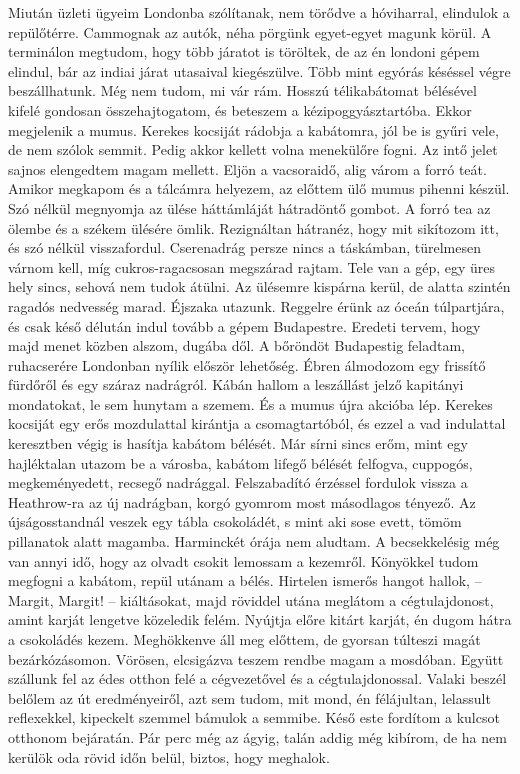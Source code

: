 Miután üzleti ügyeim Londonba szólítanak, nem törődve a hóviharral,
elindulok a repülőtérre. Cammognak az autók, néha pörgünk
egyet-egyet magunk körül. A terminálon megtudom, hogy több járatot
is töröltek, de az én londoni gépem elindul, bár az indiai járat utasaival
kiegészülve. Több mint egyórás késéssel végre beszállhatunk. Még
nem tudom, mi vár rám. Hosszú télikabátomat bélésével kifelé gondosan
összehajtogatom, és beteszem a kézipoggyásztartóba. Ekkor megjelenik
a mumus. Kerekes kocsiját rádobja a kabátomra, jól be is gyűri
vele, de nem szólok semmit. Pedig akkor kellett volna menekülőre fogni.
Az intő jelet sajnos elengedtem magam mellett. Eljön a vacsoraidő,
alig várom a forró teát. Amikor megkapom és a tálcámra helyezem, az
előttem ülő mumus pihenni készül. Szó nélkül megnyomja az ülése
háttámláját hátradöntő gombot. A forró tea az ölembe és a székem
ülésére ömlik. Rezignáltan hátranéz, hogy mit sikítozom itt, és szó
nélkül visszafordul. Cserenadrág persze nincs a táskámban, türelmesen
várnom kell, míg cukros-ragacsosan megszárad rajtam. Tele van a
gép, egy üres hely sincs, sehová nem tudok átülni. Az ülésemre kispárna
kerül, de alatta szintén ragadós nedvesség marad. Éjszaka utazunk.
Reggelre érünk az óceán túlpartjára, és csak késő délután indul tovább
a gépem Budapestre. Eredeti tervem, hogy majd menet közben alszom,
dugába dől. A bőröndöt Budapestig feladtam, ruhacserére Londonban
nyílik először lehetőség. Ébren álmodozom egy frissítő fürdőről
és egy száraz nadrágról. Kábán hallom a leszállást jelző kapitányi
mondatokat, le sem hunytam a szemem. És a mumus újra akcióba lép.
Kerekes kocsiját egy erős mozdulattal kirántja a csomagtartóból, és
ezzel a vad indulattal keresztben végig is hasítja kabátom bélését. Már
sírni sincs erőm, mint egy hajléktalan utazom be a városba, kabátom
lifegő bélését felfogva, cuppogós, megkeményedett, recsegő nadrággal.
Felszabadító érzéssel fordulok vissza a Heathrow-ra az új nadrágban,
korgó gyomrom most másodlagos tényező. Az újságosstandnál veszek
egy tábla csokoládét, s mint aki sose evett, tömöm pillanatok alatt
magamba. Harminckét órája nem aludtam. A becsekkelésig még van annyi
idő, hogy az olvadt csokit lemossam a kezemről. Könyökkel tudom
megfogni a kabátom, repül utánam a bélés. Hirtelen ismerős hangot
hallok, -- Margit, Margit! -- kiáltásokat, majd röviddel utána meglátom
a cégtulajdonost, amint karját lengetve közeledik felém. Nyújtja
előre kitárt karját, én dugom hátra a csokoládés kezem. Meghökkenve
áll meg előttem, de gyorsan túlteszi magát bezárkózásomon. Vörösen,
elcsigázva teszem rendbe magam a mosdóban. Együtt szállunk fel az
édes otthon felé a cégvezetővel és a cégtulajdonossal. Valaki beszél
belőlem az út eredményeiről, azt sem tudom, mit mond, én félájultan,
lelassult reflexekkel, kipeckelt szemmel bámulok a semmibe. Késő este
fordítom a kulcsot otthonom bejáratán. Pár perc még az ágyig, talán
addig még kibírom, de ha nem kerülök oda rövid időn belül, biztos,
hogy meghalok.

